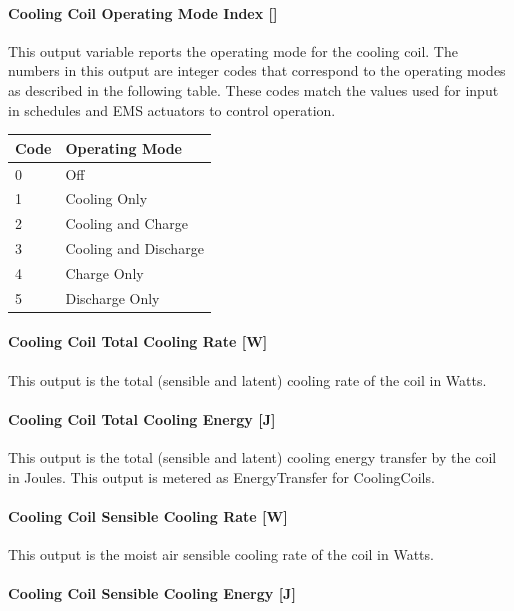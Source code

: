 \paragraph{\texorpdfstring{Cooling Coil Operating Mode Index {[]}}{Cooling Coil Operating Mode Index }}\label{cooling-coil-operating-mode-index}

This output variable reports the operating mode for the cooling coil. The numbers in this output are integer codes that correspond to the operating modes as described in the following table. These codes match the values used for input in schedules and EMS actuators to control operation.

\begin{longtable}[c]{@{}ll@{}}
\toprule 
Code & Operating Mode \tabularnewline \midrule
\endhead
0 & Off \tabularnewline
1 & Cooling Only \tabularnewline
2 & Cooling and Charge \tabularnewline
3 & Cooling and Discharge \tabularnewline
4 & Charge Only \tabularnewline
5 & Discharge Only \tabularnewline
\bottomrule
\end{longtable}

\paragraph{Cooling Coil Total Cooling Rate {[}W{]}}\label{cooling-coil-total-cooling-rate-w-10}

This output is the total (sensible and latent) cooling rate of the coil in Watts.

\paragraph{Cooling Coil Total Cooling Energy {[}J{]}}\label{cooling-coil-total-cooling-energy-j-10}

This output is the total (sensible and latent) cooling energy transfer by the coil in Joules. This output is metered as EnergyTransfer for CoolingCoils.

\paragraph{Cooling Coil Sensible Cooling Rate {[}W{]}}\label{cooling-coil-sensible-cooling-rate-w-10}

This output is the moist air sensible cooling rate of the coil in Watts.

\paragraph{Cooling Coil Sensible Cooling Energy {[}J{]}}\label{cooling-coil-sensible-cooling-energy-j-10}

